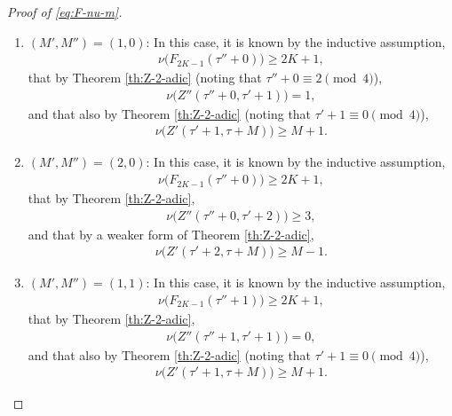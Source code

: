 \documentclass[12pt,reqno]{amsart}
\numberwithin{equation}{section}
\theoremstyle{theorem}
\theoremstyle{definition}
\begin{document}
\begin{proof}[Proof of \eqref{eq:F-nu-m}]
\begin{enumerate}[label={\textbf{(\alph*).}},leftmargin=*,labelsep=0cm,align=left]
		\item $(M',M'')=(1,0)$: In this case, it is known by the inductive assumption,
		\begin{align*}
			\nu\big(F_{2K-1}(\tau'' + 0)\big) \ge 2K + 1,
		\end{align*}
		that by Theorem \ref{th:Z-2-adic} (noting that $\tau''+0\equiv 2 \pmod{4}$),
		\begin{align*}
			\nu\big(Z''(\tau'' + 0,\tau'+1)\big) = 1,
		\end{align*}
		and that also by Theorem \ref{th:Z-2-adic} (noting that $\tau'+1\equiv 0\pmod{4}$),
		\begin{align*}
			\nu\big(Z'(\tau' + 1,\tau+M)\big) \ge M+1.
		\end{align*}
	
		\item $(M',M'')=(2,0)$: In this case, it is known by the inductive assumption,
		\begin{align*}
			\nu\big(F_{2K-1}(\tau'' + 0)\big) \ge 2K + 1,
		\end{align*}
		that by Theorem \ref{th:Z-2-adic},
		\begin{align*}
			\nu\big(Z''(\tau'' + 0,\tau'+2)\big) \ge 3,
		\end{align*}
		and that by a weaker form of Theorem \ref{th:Z-2-adic},
		\begin{align*}
			\nu\big(Z'(\tau' + 2,\tau+M)\big) \ge M-1.
		\end{align*}
	
		\item $(M',M'')=(1,1)$: In this case, it is known by the inductive assumption,
		\begin{align*}
			\nu\big(F_{2K-1}(\tau'' + 1)\big) \ge 2K + 1,
		\end{align*}
		that by Theorem \ref{th:Z-2-adic},
		\begin{align*}
			\nu\big(Z''(\tau'' + 1,\tau'+1)\big) = 0,
		\end{align*}
		and that also by Theorem \ref{th:Z-2-adic} (noting that $\tau'+1\equiv 0\pmod{4}$),
		\begin{align*}
			\nu\big(Z'(\tau' + 1,\tau+M)\big) \ge M+1.
		\end{align*}
	

\end{enumerate}
\end{proof}
\end{document}
